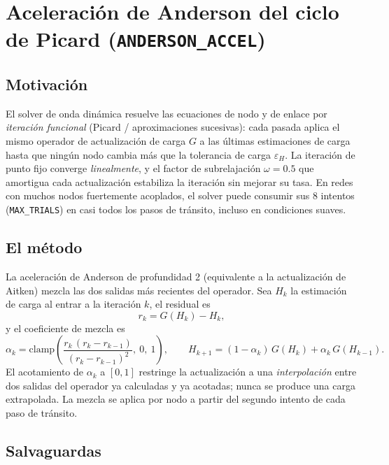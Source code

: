 \documentclass[11pt,a4paper]{article}
\begin{document}
\section{Aceleración de Anderson del ciclo de Picard (\texttt{ANDERSON\_ACCEL})}
\label{sec:anderson}

\subsection{Motivación}

El solver de onda dinámica resuelve las ecuaciones de nodo y de enlace por
\emph{iteración funcional} (Picard / aproximaciones sucesivas): cada pasada
aplica el mismo operador de actualización de carga $G$ a las últimas
estimaciones de carga hasta que ningún nodo cambia más que la tolerancia de
carga $\varepsilon_H$. La iteración de punto fijo converge \emph{linealmente},
y el factor de subrelajación $\omega = 0.5$ que amortigua cada actualización
estabiliza la iteración sin mejorar su tasa. En redes con muchos nodos
fuertemente acoplados, el solver puede consumir sus 8 intentos
(\texttt{MAX\_TRIALS}) en casi todos los pasos de tránsito, incluso en
condiciones suaves.

\subsection{El método}

La aceleración de Anderson de profundidad 2 (equivalente a la actualización de
Aitken) mezcla las dos salidas más recientes del operador. Sea
$H_k$ la estimación de carga al entrar a la iteración $k$, el residual es
\begin{equation}
  r_k = G(H_k) - H_k,
\end{equation}
y el coeficiente de mezcla es
\begin{equation}
  \alpha_k = \mathrm{clamp}\!\left(
    \frac{r_k\,(r_k - r_{k-1})}{(r_k - r_{k-1})^{2}},\ 0,\ 1\right),
  \qquad
  H_{k+1} = (1-\alpha_k)\,G(H_k) + \alpha_k\,G(H_{k-1}).
\end{equation}
El acotamiento de $\alpha_k$ a $[0,1]$ restringe la actualización a una
\emph{interpolación} entre dos salidas del operador ya calculadas y ya acotadas;
nunca se produce una carga extrapolada. La mezcla se aplica por nodo a partir
del segundo intento de cada paso de tránsito.

\subsection{Salvaguardas}
\end{document}
